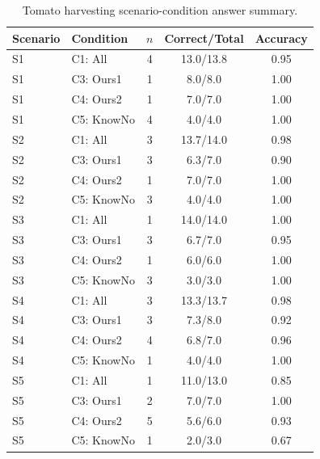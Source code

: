 \begin{table}[h]
\centering
\caption{Tomato harvesting scenario-condition answer summary.}
\label{tab:app_tomato_answer_summary}
\scriptsize
\setlength{\tabcolsep}{4pt}
\begin{tabular}{llccc}
\toprule
\textbf{Scenario} & \textbf{Condition} & \textbf{$n$} & \textbf{Correct/Total} & \textbf{Accuracy} \\
\midrule
S1 & C1: All & 4 & 13.0/13.8 & 0.95 \\
S1 & C3: Ours1 & 1 & 8.0/8.0 & 1.00 \\
S1 & C4: Ours2 & 1 & 7.0/7.0 & 1.00 \\
S1 & C5: KnowNo & 4 & 4.0/4.0 & 1.00 \\
S2 & C1: All & 3 & 13.7/14.0 & 0.98 \\
S2 & C3: Ours1 & 3 & 6.3/7.0 & 0.90 \\
S2 & C4: Ours2 & 1 & 7.0/7.0 & 1.00 \\
S2 & C5: KnowNo & 3 & 4.0/4.0 & 1.00 \\
S3 & C1: All & 1 & 14.0/14.0 & 1.00 \\
S3 & C3: Ours1 & 3 & 6.7/7.0 & 0.95 \\
S3 & C4: Ours2 & 1 & 6.0/6.0 & 1.00 \\
S3 & C5: KnowNo & 3 & 3.0/3.0 & 1.00 \\
S4 & C1: All & 3 & 13.3/13.7 & 0.98 \\
S4 & C3: Ours1 & 3 & 7.3/8.0 & 0.92 \\
S4 & C4: Ours2 & 4 & 6.8/7.0 & 0.96 \\
S4 & C5: KnowNo & 1 & 4.0/4.0 & 1.00 \\
S5 & C1: All & 1 & 11.0/13.0 & 0.85 \\
S5 & C3: Ours1 & 2 & 7.0/7.0 & 1.00 \\
S5 & C4: Ours2 & 5 & 5.6/6.0 & 0.93 \\
S5 & C5: KnowNo & 1 & 2.0/3.0 & 0.67 \\
\bottomrule
\end{tabular}
\end{table}

